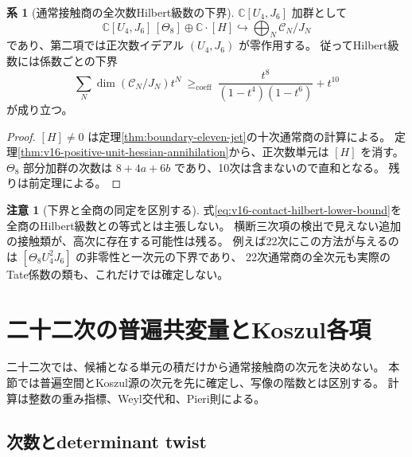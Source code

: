 \documentclass[a4paper,11pt]{ltjsarticle}
\theoremstyle{definition}
\newtheorem{remark}[theorem]{注意}
\newtheorem{corollary}[theorem]{系}
\begin{document}
\begin{corollary}[通常接触商の全次数Hilbert級数の下界]
\label{cor:v16-contact-hilbert-lower-bound}
$\mathbb C[U_4,J_6]$ 加群として
\[
 \mathbb C[U_4,J_6]\,[\Theta_8]\oplus\mathbb C\cdot[H]
 \hookrightarrow\bigoplus_N\mathcal C_N/J_N
\]
であり、第二項では正次数イデアル $(U_4,J_6)$ が零作用する。
従ってHilbert級数には係数ごとの下界
\begin{equation}\label{eq:v16-contact-hilbert-lower-bound}
 \sum_N\dim(\mathcal C_N/J_N)t^N
 \ \ge_{\mathrm{coeff}}\
 \frac{t^8}{(1-t^4)(1-t^6)}+t^{10}
\end{equation}
が成り立つ。
\end{corollary}

\begin{proof}
$[H]\ne0$ は定理\ref{thm:boundary-eleven-jet}の十次通常商の計算による。
定理\ref{thm:v16-positive-unit-hessian-annihilation}から、正次数単元は $[H]$ を消す。
$\Theta_8$ 部分加群の次数は $8+4a+6b$ であり、10次は含まないので直和となる。
残りは前定理による。
\end{proof}

\begin{remark}[下界と全商の同定を区別する]
式\eqref{eq:v16-contact-hilbert-lower-bound}を全商のHilbert級数との等式とは主張しない。
横断三次項の検出で見えない追加の接触類が、高次に存在する可能性は残る。
例えば22次にこの方法が与えるのは $[\Theta_8U_4^2J_6]$ の非零性と一次元の下界であり、
22次通常商の全次元も実際のTate係数の類も、これだけでは確定しない。
\end{remark}



\section{二十二次の普遍共変量とKoszul各項}
\label{sec:v16-characters}

二十二次では、候補となる単元の積だけから通常接触商の次元を決めない。
本節では普遍空間とKoszul源の次元を先に確定し、写像の階数とは区別する。
計算は整数の重み指標、Weyl交代和、Pieri則による。

\subsection{次数とdeterminant twist}
\end{document}
